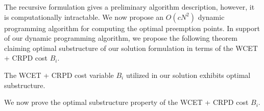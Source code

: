 \noindent
The recursive formulation gives a preliminary algorithm description, however, it is computationally intractable.  We now propose an \begin{math}O(cN^{2})\end{math} dynamic programming algorithm for computing the optimal preemption points.  In support of our dynamic programming algorithm, we propose the following theorem claiming optimal substructure of our solution formulation in terms of the WCET + CRPD cost $B_{i}$.

\begin{theorem}
\label{thm:optimal-substructure-cost}
The WCET + CRPD cost variable $B_{i}$ utilized in our solution exhibits optimal substructure.
\end{theorem}

\noindent
We now prove the optimal substructure property of the WCET + CRPD cost $B_{i}$.
\newline
\noindent
